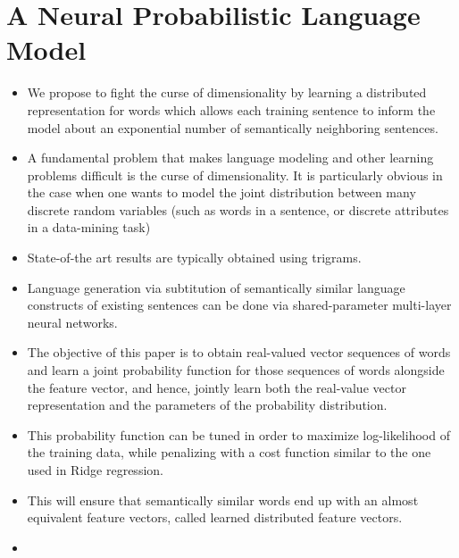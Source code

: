 \documentclass[11pt,a4paper]{article}
\begin{document}


\section{A Neural Probabilistic Language Model} %
\label{sec:a_neural_probabilistic_language_model}

  \begin{itemize}
    \item 
    We propose to fight the curse of dimensionality by learning a distributed representation for words which allows each training sentence to inform the model about an exponential number of semantically neighboring sentences.
    \item 
    A fundamental problem that makes language modeling and other learning problems difficult is the curse of dimensionality. It is particularly obvious in the case when one wants to model the joint distribution between many discrete random variables (such as words in a sentence, or discrete attributes in a data-mining task)
    \item 
    State-of-the art results are typically obtained using trigrams.
    \item 
    Language generation via subtitution of semantically similar language constructs of existing sentences can be done via shared-parameter multi-layer neural networks.
    \item 
    The objective of this paper is to obtain real-valued vector sequences of words and learn a joint probability function for those sequences of words alongside the feature vector, and hence, jointly learn both the real-value vector representation and the parameters of the probability distribution.
    \item 
    This probability function can be tuned in order to maximize log-likelihood of the training data, while penalizing with a cost function similar to the one used in Ridge regression.
    \item 
    This will ensure that semantically similar words end up with an almost equivalent feature vectors, called learned distributed feature vectors.
    \item 
    
  \end{itemize}



\newpage



\end{document}
